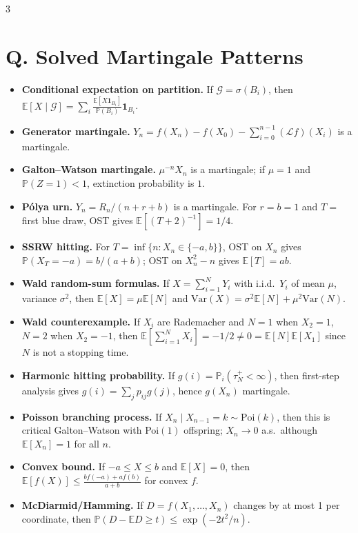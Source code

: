 \documentclass[8pt]{extarticle}
\newcommand{\PP}{\mathbb{P}}
\newcommand{\E}{\mathbb{E}}
\newcommand{\Var}{\mathrm{Var}}
\newcommand{\1}{\mathbf{1}}
\begin{document}
\begin{multicols*}{3}
\section*{Q. Solved Martingale Patterns}
\begin{itemize}
\item \textbf{Conditional expectation on partition.} If $\mathcal G=\sigma(B_i)$, then $\E[X\mid\mathcal G]=\sum_i\frac{\E[X\1_{B_i}]}{\PP(B_i)}\1_{B_i}$.
\item \textbf{Generator martingale.} $Y_n=f(X_n)-f(X_0)-\sum_{i=0}^{n-1}(\mathcal Lf)(X_i)$ is a martingale.
\item \textbf{Galton--Watson martingale.} $\mu^{-n}X_n$ is a martingale; if $\mu=1$ and $\PP(Z=1)<1$, extinction probability is $1$.
\item \textbf{P\'olya urn.} $Y_n=R_n/(n+r+b)$ is a martingale. For $r=b=1$ and $T=$ first blue draw, OST gives $\E[(T+2)^{-1}]=1/4$.
\item \textbf{SSRW hitting.} For $T=\inf\{n:X_n\in\{-a,b\}\}$, OST on $X_n$ gives $\PP(X_T=-a)=b/(a+b)$; OST on $X_n^2-n$ gives $\E[T]=ab$.
\item \textbf{Wald random-sum formulas.} If $X=\sum_{i=1}^N Y_i$ with i.i.d.\ $Y_i$ of mean $\mu$, variance $\sigma^2$, then $\E[X]=\mu\E[N]$ and $\Var(X)=\sigma^2\E[N]+\mu^2\Var(N)$.
\item \textbf{Wald counterexample.} If $X_i$ are Rademacher and $N=1$ when $X_2=1$, $N=2$ when $X_2=-1$, then $\E[\sum_{i=1}^N X_i]=-1/2\neq0=\E[N]\E[X_1]$ since $N$ is not a stopping time.
\item \textbf{Harmonic hitting probability.} If $g(i)=\PP_i(\tau_N^+<\infty)$, then first-step analysis gives $g(i)=\sum_jp_{ij}g(j)$, hence $g(X_n)$ martingale.
\item \textbf{Poisson branching process.} If $X_n\mid X_{n-1}=k\sim\mathrm{Poi}(k)$, then this is critical Galton--Watson with Poi$(1)$ offspring; $X_n\to0$ a.s.\ although $\E[X_n]=1$ for all $n$.
\item \textbf{Convex bound.} If $-a\le X\le b$ and $\E[X]=0$, then
$\E[f(X)]\le\frac{bf(-a)+af(b)}{a+b}$ for convex $f$.
\item \textbf{McDiarmid/Hamming.} If $D=f(X_1,\dots,X_n)$ changes by at most 1 per coordinate, then
$\PP(D-\E D\ge t)\le\exp(-2t^2/n)$.
\end{itemize}


\end{multicols*}
\end{document}

